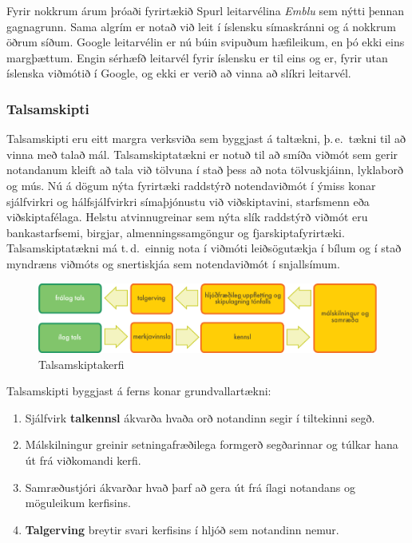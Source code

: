 \begin{multicols}{2}
Fyrir nokkrum árum þróaði fyrirtækið Spurl leitarvélina \textit{Emblu} sem nýtti þennan gagnagrunn. Sama algrím er notað við leit í íslensku símaskránni og á nokkrum öðrum síðum. Google leitarvélin er nú búin svipuðum hæfileikum, en þó ekki eins margþættum. Engin sérhæfð leitarvél fyrir íslensku er til eins og er, fyrir utan íslenska viðmótið í Google, og ekki er verið að vinna að slíkri leitarvél.
  
\subsubsection{Talsamskipti}

Talsamskipti eru eitt margra verksviða sem byggjast á taltækni, þ.\,e.~tækni til að vinna með talað mál. Talsamskiptatækni er notuð til að smíða viðmót sem gerir notandanum kleift að tala við tölvuna í stað þess að nota tölvuskjáinn, lyklaborð og mús. Nú á dögum nýta fyrirtæki raddstýrð notendaviðmót í ýmiss konar sjálfvirkri og hálfsjálfvirkri símaþjónustu við viðskiptavini, starfsmenn eða viðskiptafélaga. Helstu atvinnugreinar sem nýta slík raddstýrð viðmót eru bankastarfsemi, birgjar, almenningssamgöngur og fjarskiptafyrirtæki. Talsamskiptatækni má t.\,d.~einnig nota í viðmóti leiðsögutækja í bílum og í stað myndræns viðmóts og snertiskjáa sem notendaviðmót í snjallsímum. 

\begin{figure}[htb]
  \center 
  \includegraphics[width=\textwidth]{../_media/icelandic/simple_speech-based_dialogue_architecture}
  \caption{Talsamskiptakerfi}
  \label{fig:dialoguearch_is}
\end{figure}

Talsamskipti byggjast á ferns konar grundvallartækni:

\begin{enumerate}
\item Sjálfvirk \textbf{talkennsl} ákvarða hvaða orð notandinn segir í tiltekinni segð. 
\item Málskilningur greinir setningafræðilega formgerð segðarinnar og túlkar hana út frá viðkomandi kerfi.
\item Samræðustjóri ákvarðar hvað þarf að gera út frá ílagi notandans og möguleikum kerfisins.
\item \textbf{Talgerving} breytir svari kerfisins í hljóð sem notandinn nemur. 
\end{enumerate}


\end{multicols}
